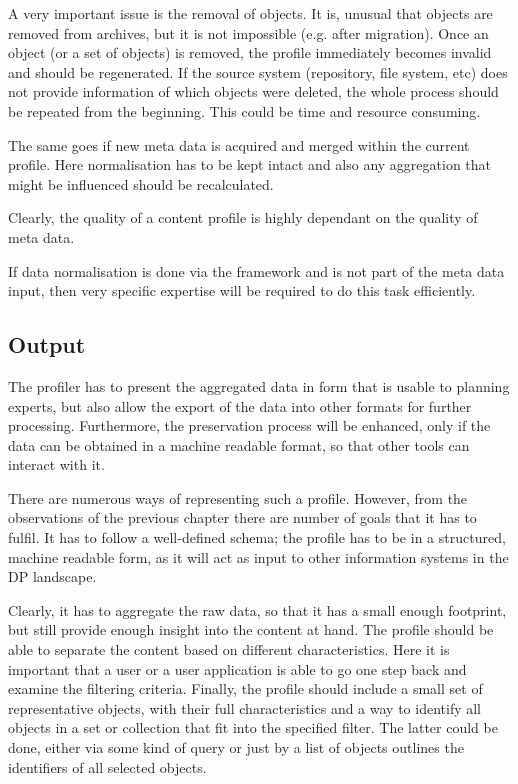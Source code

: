 A very important issue is the removal of objects. It is, unusual that objects are removed from archives, but it is not impossible (e.g. after migration). Once an object (or a set of objects) is removed, the profile immediately becomes invalid and should be regenerated. If the source system (repository, file system, etc) does not provide information of which objects were deleted, the whole process should be repeated from the beginning. This could be time and resource consuming.

The same goes if new meta data is acquired and merged within the current profile. Here normalisation has to be kept intact and also any aggregation that might be influenced should be recalculated.

Clearly, the quality of a content profile is highly dependant on the quality of meta data.

If data normalisation is done via the framework and is not part of the meta data input, then very specific expertise will be required to do this task efficiently.

\subsection{Output}
The profiler has to present the aggregated data in form that is usable to planning experts, but also allow the export of the data into other formats for further processing. Furthermore, the preservation process will be enhanced, only if the data
can be obtained in a machine readable format, so that other tools can interact with it.

There are numerous ways of representing such a profile. However, from the observations of the previous chapter there are number of goals that it has to fulfil. It has to follow a well-defined schema; the profile has to be in a structured, machine readable form, as it will act as input to other information systems in the DP landscape.

Clearly, it has to aggregate the raw data, so that it has a small enough footprint, but still provide enough insight into the content at hand. The profile should be able to separate the content based on different characteristics. Here it is important that a user or a user application is able to go one step back and examine the filtering criteria. Finally, the profile should include a small set of representative objects, with their full characteristics and a way to identify all objects in a set or collection that fit into the specified filter. The latter could be done, either via some kind of query or just by a list of objects outlines the identifiers of all selected objects.

